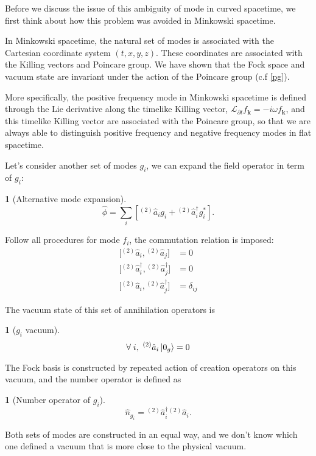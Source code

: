 \documentclass[12pt]{article}
\numberwithin{equation}{section}
\theoremstyle{1style}
\newtheorem{cthm}[equation]{}
\newcommand{\p}{\partial}
\begin{document}
Before we discuss the issue of this ambiguity of mode in curved spacetime,
we first think about how this problem was avoided in Minkowski spacetime.

In Minkowski spacetime, the natural set of modes is associated with the Cartesian coordinate system \((t,x,y,z)\).
These coordinates are associated with the Killing vectors and Poincare group.
We have shown that the Fock space and vacuum state are invariant under the action of the Poincare group (c.f \ref{pg}).

More specifically, the positive frequency mode in Minkowski spacetime is defined through the Lie derivative along the
timelike Killing vector, \(\mathcal{L}_{\p t}f_{\mathbf{k}}=-i\omega f_{\mathbf{k}}\), and this timelike Killing vector
are associated with the Poincare group, so that we are always able to distinguish positive frequency and negative frequency modes in
flat spacetime.

Let's consider another set of modes \(g_i\), we can expand the field operator in term of \(g_i\):
\begin{cthm}[Alternative mode expansion]\label{ame}
  \[\hat{\phi}=\sum_i\left[{}^{(2)}\hat{{a}}_i g_i+{}^{(2)}\hat{{a}}_i^\dagger g_i^*\right].\]
\end{cthm}
Follow all procedures for mode \(f_i\), the commutation relation is imposed:
\begin{align}
  \bigl[{}^{(2)}\hat{{a}}_{i},{}^{(2)}\hat{{a}}_{j}\bigr]                     & =0           \\
  \bigl[{}^{(2)}\hat{{a}}^{\dagger}_{i},{}^{(2)}\hat{{a}}^{\dagger}_{j}\bigr] & =0           \\
  \bigl[{}^{(2)}\hat{{a}}_{i},{}^{(2)}\hat{{a}}^{\dagger}_{j}\bigr]           & =\delta_{ij}
\end{align}

The vacuum state of this set of annihilation operators is
\begin{cthm}[\(g_i\) vacuum]
  \[\forall\;i,\ {}^{(2)}\hat{{a}}_i\ket{0_g}=0\]
\end{cthm}
The Fock basis is constructed by repeated action of creation operators on this vacuum, and the number operator is defined as
\begin{cthm}[Number operator of \(g_i\)]
  \[\hat{n}_{g_i}={}^{(2)}\hat{{a}}_i^\dagger {}^{(2)}\hat{{a}}_i.\]
\end{cthm}

Both sets of modes are constructed in an equal way, and we don't know which one defined a vacuum that is more close to the physical vacuum.
\end{document}
